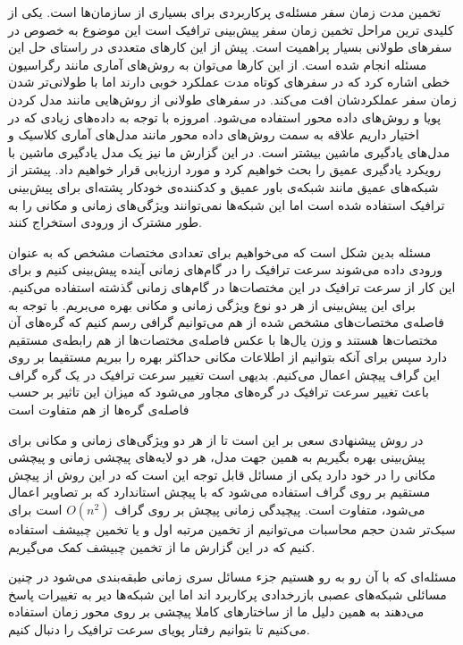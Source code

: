
تخمین مدت زمان سفر مسئله‌ی پرکاربردی برای بسیاری از سازمان‌ها است. یکی از کلیدی ترین مراحل تخمین زمان سفر پیش‌بینی ترافیک است این موضوع به خصوص در سفرهای طولانی بسیار پراهمیت است. پیش از این کارهای متعددی در راستای حل این مسئله انجام شده است. از این کارها می‌توان به روش‌های آماری مانند رگراسیون خطی اشاره کرد که در سفرهای کوتاه مدت عملکرد خوبی دارند اما با طولانی‌تر شدن زمان سفر عملکردشان افت می‌کند. در سفرهای طولانی از روش‌هایی مانند مدل کردن پویا و روش‌های داده محور استفاده می‌شود. امروزه با توجه به داده‌های زیادی که در اختیار داریم علاقه به سمت روش‌های داده محور مانند مدل‌های آماری کلاسیک و مدل‌های یادگیری ماشین  بیشتر است. در این گزارش ما نیز یک مدل یادگیری ماشین با رویکرد یادگیری عمیق را بحث خواهیم کرد و مورد ارزیابی قرار خواهیم داد. پیشتر از شبکه‌های عمیق مانند شبکه‌ی باور عمیق و کدکننده‌ی خودکار پشته‌ای برای پیش‌بینی ترافیک استفاده شده است اما این شبکه‌ها نمی‌توانند ویژگی‌های زمانی و مکانی را به طور مشترک از ورودی استخراج کنند.

مسئله بدین شکل است که می‌خواهیم برای تعدادی مختصات مشخص که به عنوان ورودی داده می‌شوند سرعت ترافیک را در گام‌های زمانی آینده پیش‌بینی کنیم و برای این کار از سرعت ترافیک در این مختصات‌ها در گام‌های زمانی گذشته استفاده می‌کنیم. برای این پیش‌بینی از هر دو نوع ویژگی زمانی و مکانی بهره می‌بریم. با توجه به فاصله‌ی مختصات‌های مشخص شده از هم می‌توانیم گرافی رسم کنیم که گره‌های آن مختصات‌ها هستند و وزن یال‌ها با عکس فاصله‌ی مختصات‌ها از هم رابطه‌ی مستقیم دارد سپس برای آنکه بتوانیم از اطلاعات مکانی حداکثر بهره را ببریم مستقیما بر روی این گراف پیچش اعمال می‌کنیم. بدیهی است تغییر سرعت ترافیک در یک گره گراف باعث تغییر سرعت ترافیک در گره‌های مجاور می‌شود که میزان این تاثیر بر حسب فاصله‌ی گره‌ها از هم متفاوت است

در روش پیشنهادی سعی بر این است تا از هر دو ویژگی‌های زمانی و مکانی برای پیش‌بینی بهره بگیریم به همین جهت مدل، هر دو لایه‌های پیچشی زمانی و پیچشی مکانی را در خود دارد یکی از مسائل قابل توجه این است که در این روش از پیچش مستقیم بر روی گراف استفاده می‌شود که با پیچش استاندارد که بر تصاویر اعمال می‌شود، متفاوت است. پیچیدگی زمانی پیچش بر روی گراف $O(n^{2})$ است برای سبک‌تر شدن حجم محاسبات می‌توانیم از تخمین مرتبه اول و یا تخمین چبیشف استفاده کنیم که در این گزارش ما از تخمین چبیشف کمک می‌گیریم.

مسئله‌ای که با آن رو به رو هستیم جزء مسائل سری زمانی طبقه‌بندی می‌شود در چنین مسائلی شبکه‌های عصبی بازرخدادی پرکاربرد اند اما این شبکه‌ها دیر به تغییرات پاسخ می‌دهند به همین دلیل ما از ساختارهای کاملا پیچشی بر روی محور زمان استفاده می‌کنیم تا بتوانیم رفتار پویای سرعت ترافیک را دنبال کنیم.


